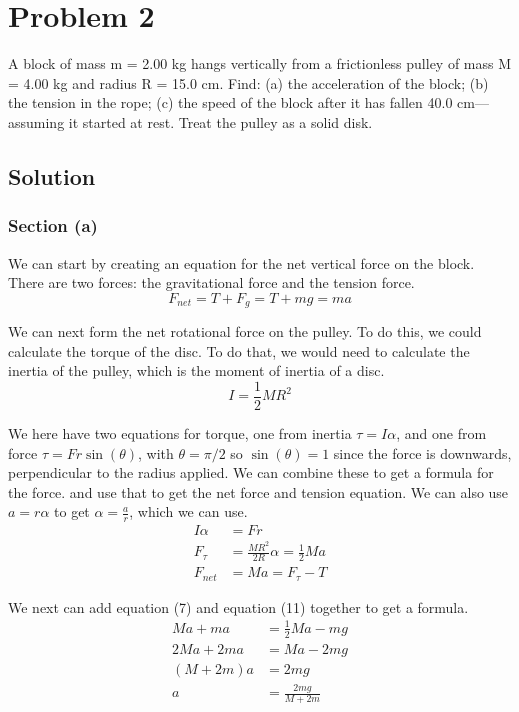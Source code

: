 \documentclass[12pt]{article}
\begin{document}
\pagebreak

\section{Problem 2}
A block of mass m = 2.00 kg hangs vertically from a frictionless pulley of mass M = 4.00 kg and radius R = 15.0 cm. Find: (a) the acceleration of the block; (b) the tension in the rope; (c) the speed of the block after it has fallen 40.0 cm—assuming it started at rest. Treat the pulley as a solid disk.

\subsection{Solution}
\subsubsection{Section (a)}
We can start by creating an equation for the net vertical force on the block. There are two forces: the gravitational force and the tension force.
\begin{equation} F_{net} = T + F_g = T + mg = ma \end{equation}

We can next form the net rotational force on the pulley. To do this, we could calculate the torque of the disc. To do that, we would need to calculate the inertia of the pulley, which is the moment of inertia of a disc.
\begin{equation} I = \frac{1}{2}MR^2 \end{equation}

We here have two equations for torque, one from inertia \(\tau = I\alpha\), and one from force \(\tau = Fr\sin(\theta)\), with $\theta = \pi/2$ so $\sin(\theta) = 1$ since the force is downwards, perpendicular to the radius applied. We can combine these to get a formula for the force. and use that to get the net force and tension equation. We can also use $a = r\alpha$ to get $\alpha = \frac{a}{r}$, which we can use. 
\begin{align}
    I\alpha &=  Fr\\
    F_\tau  &=  \frac{MR^2}{2R}\alpha
        =   \frac{1}{2}Ma\\
    F_{net} &=  Ma
        =   F_\tau - T
\end{align}

We next can add equation (7) and equation (11) together to get a formula.
\begin{align}
    Ma + ma &=  \frac{1}{2}Ma - mg\\
    2Ma + 2ma   &=  Ma - 2mg\\
    (M + 2m)a   &=  2mg\\
    a   &=  \frac{2mg}{M + 2m}
\end{align}
\end{document}
